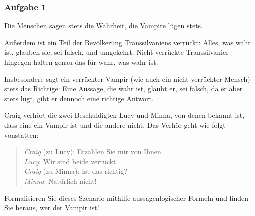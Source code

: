 \documentclass{beamer}
\begin{document}
	\begin{frame} \frametitle{Aufgabe 1}
		\footnotesize\justifying
		Die Menschen sagen stets die Wahrheit, die Vampire lügen stets.  
		
		Außerdem ist ein Teil der Bevölkerung Transsilvaniens verrückt: Alles, was wahr ist, glauben sie, sei falsch, und umgekehrt. Nicht verrückte Transsilvanier hingegen halten genau das für wahr, was wahr ist. 
		
		Insbesondere sagt ein verrückter Vampir (wie auch ein nicht-verrückter Mensch) stets das Richtige: Eine Aussage, die wahr ist, glaubt er, sei falsch, da er aber stets lügt, gibt er dennoch eine richtige Antwort.
		
		Craig verhört die zwei Beschuldigten Lucy und Minna, von denen bekannt ist,	dass eine ein Vampir ist und die andere nicht. Das Verhör geht wie folgt	vonstatten:
		
		\begin{quote}
			\emph{Craig} (zu Lucy): Erzählen Sie mir von Ihnen.\\
			\emph{Lucy}: Wir sind beide verrückt.\\
			\emph{Craig} (zu Minna): Ist das richtig?\\
			\emph{Minna}: Natürlich nicht!
		\end{quote}
	
		Formalisieren Sie dieses Szenario mithilfe aussagenlogischer Formeln und
		finden Sie heraus, wer der Vampir ist!
	\end{frame}
\end{document}
